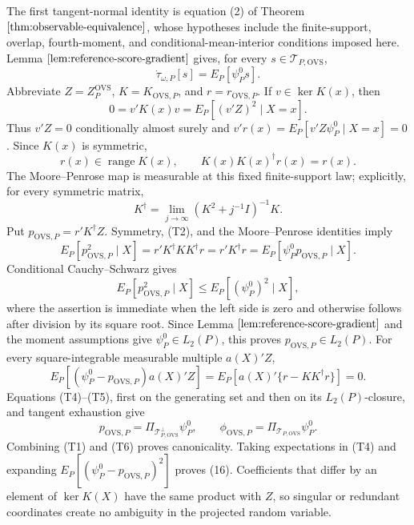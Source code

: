 The first tangent-normal identity is equation (2) of Theorem \(\ref{thm:observable-equivalence}\), whose hypotheses include the finite-support, overlap, fourth-moment, and conditional-mean-interior conditions imposed here.  Lemma \(\ref{lem:reference-score-gradient}\) gives, for every \(s\in\mathcal T_{P,\mathrm{OVS}}\),
\[
\dot\tau_{\omega,P}[s]=E_P[\psi_P^0s].
\tag{T1}
\]
Abbreviate \(Z=Z_P^{\mathrm{OVS}}\), \(K=K_{\mathrm{OVS},P}\), and \(r=r_{\mathrm{OVS},P}\).  If \(v\in\ker K(x)\), then
\[
0=v'K(x)v=E_P[(v'Z)^2\mid X=x].
\]
Thus \(v'Z=0\) conditionally almost surely and \(v'r(x)=E_P[v'Z\psi_P^0\mid X=x]=0\).  Since \(K(x)\) is symmetric,
\[
r(x)\in\operatorname{range}K(x),
\qquad K(x)K(x)^\dagger r(x)=r(x).
\tag{T2}
\]
The Moore--Penrose map is measurable at this fixed finite-support law; explicitly, for every symmetric matrix,
\[
K^\dagger=\lim_{j\to\infty}(K^2+j^{-1}I)^{-1}K.
\tag{T3}
\]
Put \(p_{\mathrm{OVS},P}=r'K^\dagger Z\).  Symmetry, (T2), and the Moore--Penrose identities imply
\[
E_P[p_{\mathrm{OVS},P}^2\mid X]
=r'K^\dagger KK^\dagger r
=r'K^\dagger r
=E_P[\psi_P^0p_{\mathrm{OVS},P}\mid X].
\tag{T4}
\]
Conditional Cauchy--Schwarz gives
\[
E_P[p_{\mathrm{OVS},P}^2\mid X]
\le E_P[(\psi_P^0)^2\mid X],
\]
where the assertion is immediate when the left side is zero and otherwise follows after division by its square root.  Since Lemma \(\ref{lem:reference-score-gradient}\) and the moment assumptions give \(\psi_P^0\in L_2(P)\), this proves \(p_{\mathrm{OVS},P}\in L_2(P)\).  For every square-integrable measurable multiple \(a(X)'Z\),
\[
E_P[(\psi_P^0-p_{\mathrm{OVS},P})a(X)'Z]
=E_P[a(X)'\{r-KK^\dagger r\}]=0.
\tag{T5}
\]
Equations (T4)--(T5), first on the generating set and then on its \(L_2(P)\)-closure, and tangent exhaustion give
\[
p_{\mathrm{OVS},P}=\Pi_{\mathcal T_{P,\mathrm{OVS}}^\perp}\psi_P^0,
\qquad
\phi_{\mathrm{OVS},P}=\Pi_{\mathcal T_{P,\mathrm{OVS}}}\psi_P^0.
\tag{T6}
\]
Combining (T1) and (T6) proves canonicality.  Taking expectations in (T4) and expanding \(E_P[(\psi_P^0-p_{\mathrm{OVS},P})^2]\) proves (16).  Coefficients that differ by an element of \(\ker K(X)\) have the same product with \(Z\), so singular or redundant coordinates create no ambiguity in the projected random variable.

